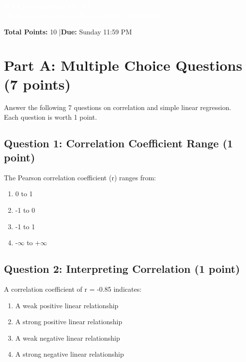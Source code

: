 \documentclass[10pt]{article}
\begin{document}
\begin{tcolorbox}[colback=osaorange,colframe=black,boxrule=2pt,arc=0pt,left=6pt,right=6pt,top=8pt,bottom=8pt]
\centering
\textcolor{white}{\textbf{\large WEEK 9 ASSIGNMENT}}\\
\textcolor{white}{\textbf{H524 Introduction to Biostatistics - Fall 2025}}
\end{tcolorbox}

\vspace{4pt}

\noindent\textbf{Total Points:} 10 \quad|\quad \textbf{Due:} Sunday 11:59 PM

\vspace{6pt}

\section*{Part A: Multiple Choice Questions (7 points)}

Answer the following 7 questions on correlation and simple linear regression. Each question is worth 1 point.

\subsection*{Question 1: Correlation Coefficient Range (1 point)}
The Pearson correlation coefficient (r) ranges from:
\begin{enumerate}[label=\Alph*., leftmargin=20pt]
\item 0 to 1
\item -1 to 0
\item -1 to 1
\item -$\infty$ to +$\infty$
\end{enumerate}

\subsection*{Question 2: Interpreting Correlation (1 point)}
A correlation coefficient of r = -0.85 indicates:
\begin{enumerate}[label=\Alph*., leftmargin=20pt]
\item A weak positive linear relationship
\item A strong positive linear relationship
\item A weak negative linear relationship
\item A strong negative linear relationship
\end{enumerate}
\end{document}
